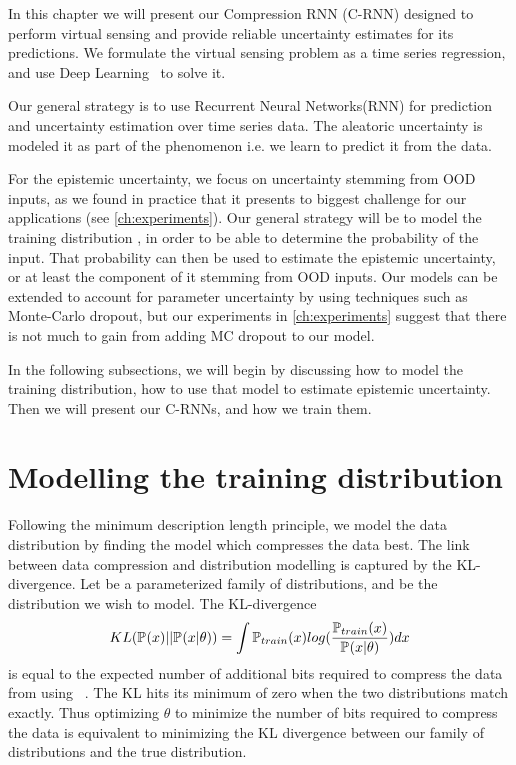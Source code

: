 \documentclass[../main.tex]{subfiles}
\begin{document}
In this chapter we will present our Compression RNN (C-RNN) designed to perform virtual sensing and provide reliable uncertainty estimates for its predictions. We formulate the virtual sensing problem as a time series regression, and use Deep Learning~\citep{goodfellow2016deep} to solve it.

Our general strategy is to use Recurrent Neural Networks(RNN) for prediction and uncertainty estimation over time series data. 
The aleatoric uncertainty is modeled it as part of the phenomenon i.e. we learn to predict it from the data.

For the epistemic uncertainty, we focus on uncertainty stemming from OOD inputs, as we found in practice that it presents to biggest challenge for our applications (see \cref{ch:experiments}). Our general strategy will be to model the training distribution , in order to be able to determine the probability of the input. That probability can then be used to estimate the epistemic uncertainty, or at least the component of it stemming from OOD inputs. Our models can be extended to account for parameter uncertainty by using techniques such as Monte-Carlo dropout\citep{gal2016dropout}, but our experiments in \cref{ch:experiments} suggest that there is not much to gain from adding MC dropout to our model. 

In the following subsections, we will begin by discussing how to model the training distribution, how to use that model to estimate epistemic uncertainty. Then we will present our C-RNNs, and how we train them.

\section{Modelling the training distribution}
\label{sec:information}

Following the minimum description length principle\citep{rissanen1978modeling}, we model the data distribution by finding the model which compresses the data best. The link between data compression and distribution modelling is captured by the KL-divergence. Let  be a parameterized family of distributions, and  be the distribution we wish to model. The KL-divergence
\begin{equation}
    \label{eq:kl}
    KL(\pdf[]{x} || \pdf{x|\theta}) = \int {\pdf[train]{x} log(\frac{\pdf[train]{x}}{\pdf{x|\theta}})} dx
\end{equation}{}
is equal to the expected number of additional bits required to compress the data from  using ~\citep[chapter~5]{mackay2003information}. The KL hits its minimum of zero when the two distributions match exactly. Thus optimizing $\theta$ to minimize the number of bits required to compress the data is equivalent to minimizing the KL divergence between our family of distributions and the true distribution. 
\end{document}
